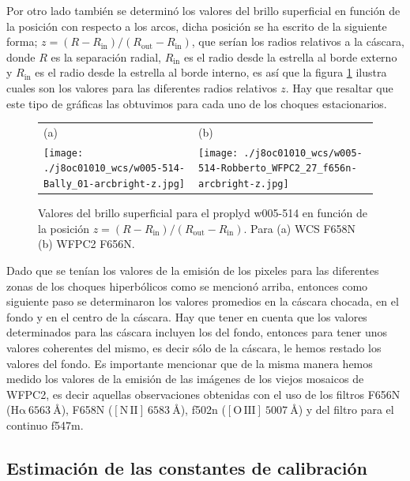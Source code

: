 \documentclass{article}
\newcommand\ha{\ensuremath{\mathrm{H}\alpha}}
\newcommand\nii{\ensuremath{\mathrm{[N\,II]}}}
\newcommand\oiii{\ensuremath{\mathrm{[O\,III]}}}
\newcommand\A{\ensuremath{\text{\AA{}}}}
\begin{document}
Por otro lado también se determinó los valores del brillo superficial en función de la posición con respecto a los arcos, dicha posición se ha escrito de la siguiente forma; \(z = (R - R_{\text{in}})/(R_{\text{out}} - R_{\text{in}})\), que serían los radios relativos a la cáscara, donde \(R\) es la separación radial, \(R_{\text{in}}\) es el radio  desde la estrella al borde externo y \(R_{\text{in}}\) es el radio desde  la estrella al borde interno, es así que la figura \ref{fig:brillo-z} ilustra cuales son los valores para las diferentes radios relativos \(z\). Hay que resaltar que este tipo de gráficas las obtuvimos para cada uno de los choques estacionarios.\\

\begin{figure}[htp]
\centering
\begin{tabular}{l l}
(a) & (b)  \\
  \texttt{[image: ./j8oc01010\_wcs/w005-514-Bally\_01-arcbright-z.jpg]}
& \texttt{[image: ./j8oc01010\_wcs/w005-514-Robberto\_WFPC2\_27\_f656n-arcbright-z.jpg]}\\
\end{tabular}
\caption{Valores del brillo superficial para el proplyd w005-514 en función de la posición  \(z = (R - R_{\text{in}})/(R_{\text{out}} - R_{\text{in}})\). Para (a) WCS F658N (b) WFPC2 F656N.}\label{fig:brillo-z}
\end{figure}

Dado que se tenían los valores de la emisión de los pixeles para las diferentes zonas de los choques hiperbólicos como se mencionó arriba, entonces como siguiente paso se determinaron los valores promedios en la cáscara chocada, en el fondo y en el centro de la cáscara. Hay que tener en cuenta que los valores determinados para las cáscara incluyen los del fondo, entonces para tener unos valores coherentes del mismo, es decir sólo de la cáscara, le hemos restado los valores del fondo. Es importante mencionar que de la misma manera hemos medido los valores de la emisión de las  imágenes de los viejos  mosaicos de WFPC2, es decir aquellas  observaciones obtenidas con el uso de los filtros F656N (\(\mathrm{\ha~6563~\A{}}\)), F658N (\(\mathrm{\nii~6583~\A{}}\)), f502n (\(\oiii{}~5007~\A{}\)) y del filtro para el continuo f547m.\\

\subsection{Estimación de las constantes de calibración}
\end{document}
